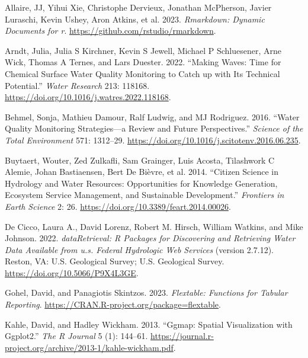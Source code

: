 \hypertarget{refs}{}
\begin{CSLReferences}{1}{0}
\leavevmode{}%
Allaire, JJ, Yihui Xie, Christophe Dervieux, Jonathan McPherson, Javier Luraschi, Kevin Ushey, Aron Atkins, et al. 2023. \emph{Rmarkdown: Dynamic Documents for r}. \url{https://github.com/rstudio/rmarkdown}.

\leavevmode{}%
Arndt, Julia, Julia S Kirchner, Kevin S Jewell, Michael P Schluesener, Arne Wick, Thomas A Ternes, and Lars Duester. 2022. {``Making Waves: Time for Chemical Surface Water Quality Monitoring to Catch up with Its Technical Potential.''} \emph{Water Research} 213: 118168. \url{https://doi.org/10.1016/j.watres.2022.118168}.

\leavevmode{}%
Behmel, Sonja, Mathieu Damour, Ralf Ludwig, and MJ Rodriguez. 2016. {``Water Quality Monitoring Strategies---a Review and Future Perspectives.''} \emph{Science of the Total Environment} 571: 1312--29. \url{https://doi.org/10.1016/j.scitotenv.2016.06.235}.

\leavevmode{}%
Buytaert, Wouter, Zed Zulkafli, Sam Grainger, Luis Acosta, Tilashwork C Alemie, Johan Bastiaensen, Bert De Bièvre, et al. 2014. {``Citizen Science in Hydrology and Water Resources: Opportunities for Knowledge Generation, Ecosystem Service Management, and Sustainable Development.''} \emph{Frontiers in Earth Science} 2: 26. \url{https://doi.org/10.3389/feart.2014.00026}.

\leavevmode{}%
De Cicco, Laura A., David Lorenz, Robert M. Hirsch, William Watkins, and Mike Johnson. 2022. \emph{dataRetrieval: R Packages for Discovering and Retrieving Water Data Available from u.s. Federal Hydrologic Web Services} (version 2.7.12). Reston, VA: U.S. Geological Survey; U.S. Geological Survey. \url{https://doi.org/10.5066/P9X4L3GE}.

\leavevmode{}%
Gohel, David, and Panagiotis Skintzos. 2023. \emph{Flextable: Functions for Tabular Reporting}. \url{https://CRAN.R-project.org/package=flextable}.

\leavevmode{}%
Kahle, David, and Hadley Wickham. 2013. {``Ggmap: Spatial Visualization with Ggplot2.''} \emph{The R Journal} 5 (1): 144--61. \url{https://journal.r-project.org/archive/2013-1/kahle-wickham.pdf}.


\end{CSLReferences}
